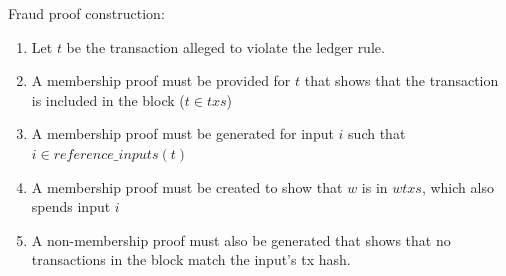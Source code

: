 \documentclass[../midgard.tex]{subfiles}
\begin{document}
Fraud proof construction:
\begin{enumerate}
  \item Let $t$ be the transaction alleged to violate the ledger rule. 
  \item A membership proof must be provided for $t$ that shows that the transaction is included in the block ($t \in txs$)
  \item A membership proof must be generated for input $i$ such that $i \in reference\_inputs(t)$
  \item A membership proof must be created to show that $w$ is in $wtxs$, which also spends input $i$
  \item A non-membership proof must also be generated that shows that no transactions in the block match the input's tx hash.
\end{enumerate}







\end{document}
